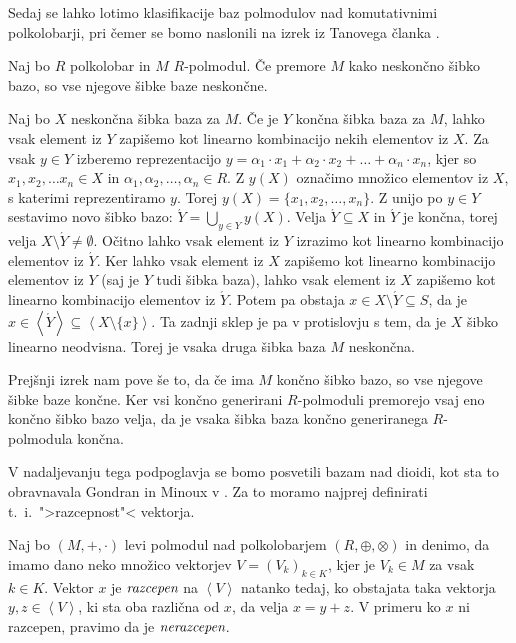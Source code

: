 \documentclass[mat1]{fmfdelo}
\newcommand{\pojem}[1]{\ensuremath{\emph{#1}}}
\newcommand{\Gen}[1]{\ensuremath{\left<{#1}\right>}}
\begin{document}
Sedaj se lahko lotimo klasifikacije baz polmodulov nad komutativnimi polkolobarji, pri čemer se bomo naslonili na izrek iz Tanovega članka \cite[izrek 3.\ 1.]{bib:Tanbase}.

\begin{izrek}
	Naj bo $R$ polkolobar in $M$ $R$-polmodul. Če premore $M$ kako neskončno šibko bazo, so vse njegove šibke baze neskončne.
\end{izrek}
\begin{dokaz}
	Naj bo $X$ neskončna šibka baza za $M$. Če je $Y$ končna šibka baza za $M$, lahko vsak element iz $Y$ zapišemo kot linearno kombinacijo nekih elementov iz $X$. Za vsak $y\in Y$ izberemo reprezentacijo $y = \alpha_1\cdot x_1 + \alpha_2\cdot x_2 + \ldots + \alpha_n\cdot x_n$, kjer so $x_1, x_2, \ldots x_n \in X$ in $\alpha_1, \alpha_2, \ldots, \alpha_n \in R$. Z $y(X)$ označimo množico elementov iz $X$, s katerimi reprezentiramo $y$. Torej $y(X) = \{x_1, x_2, \ldots, x_n\}$. Z unijo po $y\in Y$ sestavimo novo šibko bazo: $\acute{Y} = \bigcup_{y\in Y}y(X)$. Velja $\acute{Y} \subseteq X$ in $\acute{Y}$ je končna, torej velja $X\setminus\acute{Y}\neq\emptyset$. Očitno lahko vsak element iz $Y$ izrazimo kot linearno kombinacijo elementov iz $\acute{Y}$. Ker lahko vsak element iz $X$ zapišemo kot linearno kombinacijo elementov iz $Y$ (saj je $Y$ tudi šibka baza), lahko vsak element iz $X$ zapišemo kot linearno kombinacijo elementov iz $\acute{Y}$. Potem pa obstaja $x\in X\setminus\acute{Y} \subseteq S$, da je $x\in \Gen{\acute{Y}}\subseteq\Gen{X\setminus\{x\}}$. Ta zadnji sklep je pa v protislovju s tem, da je $X$ šibko linearno neodvisna. Torej je vsaka druga šibka baza $M$ neskončna.
\end{dokaz}

	Prejšnji izrek nam pove še to, da če ima $M$ končno šibko bazo, so vse njegove šibke baze končne. Ker vsi končno generirani $R$-polmoduli premorejo vsaj eno končno šibko bazo velja, da je vsaka šibka baza končno generiranega $R$-polmodula končna.

V nadaljevanju tega podpoglavja se bomo posvetili bazam nad dioidi, kot sta to obravnavala Gondran in Minoux v \cite[poglavje 5.\,2.\,5.\,]{bib:Gondran}. Za to moramo najprej definirati t.~i.\  ">razcepnost"< vektorja.
\begin{definicija}
	Naj bo $(M, +,\cdot)$ levi polmodul nad polkolobarjem $(R, \oplus, \otimes)$ in denimo, da imamo dano neko množico vektorjev $V = (V_k)_{k\in K}$, kjer je $V_k\in M$ za vsak $k\in K$. Vektor $x$ je \pojem{razcepen} na \Gen{V} natanko tedaj, ko obstajata taka vektorja $y, z\in \Gen{V}$, ki sta oba različna od $x$, da velja $x = y + z$. V primeru ko $x$ ni razcepen, pravimo da je \pojem{nerazcepen}.
\end{definicija}
\end{document}
